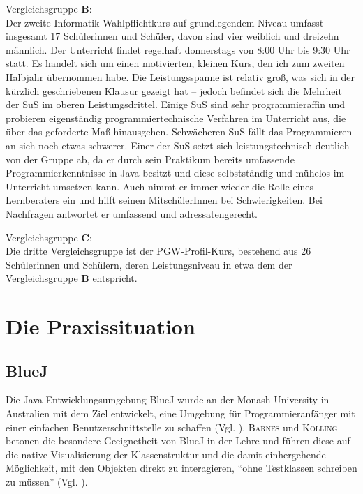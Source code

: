 \documentclass[paper=a4, DIV=13, BCOR=12mm, twoside=on, onecolumn=on, open = any, titlepage =on, parskip =half-, headsepline = on, footsepline = on, chapterprefix = on, sectionprefix = on, appendixprefix = off, fontsize = 11pt, numbers = noenddot, abstract = off]{scrreprt}
\begin{document}
Vergleichsgruppe \textsc{\textbf{B}}:\\
Der zweite Informatik-Wahlpflichtkurs auf grundlegendem Niveau umfasst insgesamt 17 Schülerinnen und Schüler, davon sind vier weiblich und dreizehn männlich. Der Unterricht findet regelhaft donnerstags von 8:00 Uhr bis 9:30 Uhr statt. 
Es handelt sich um einen motivierten, kleinen Kurs, den ich zum zweiten Halbjahr übernommen habe. Die Leistungsspanne ist relativ groß, was sich in der kürzlich geschriebenen Klausur gezeigt hat – jedoch befindet sich die Mehrheit der SuS im oberen Leistungsdrittel. Einige SuS sind sehr programmieraffin und probieren eigenständig programmiertechnische Verfahren im Unterricht aus, die über das geforderte Maß hinausgehen. Schwächeren SuS fällt das Programmieren an sich noch etwas schwerer. Einer der SuS setzt sich leistungstechnisch deutlich von der Gruppe ab, da er durch sein Praktikum bereits umfassende Programmierkenntnisse in Java besitzt und diese selbstständig und mühelos im Unterricht umsetzen kann. Auch nimmt er immer wieder die Rolle eines Lernberaters ein und hilft seinen MitschülerInnen bei Schwierigkeiten. Bei Nachfragen antwortet er umfassend und adressatengerecht.

Vergleichsgruppe \textsc{\textbf{C}}:\\
Die dritte Vergleichsgruppe ist der PGW-Profil-Kurs, bestehend aus 26 Schülerinnen und Schülern, deren Leistungsniveau in etwa dem der Vergleichsgruppe \textsc{\textbf{B}} entspricht. 

\chapter{Die Praxissituation}


\par \singlespacing
 \section{BlueJ}

\label{sec:bluej}
Die Java-Entwicklungsumgebung BlueJ wurde an der Monash University in Australien mit dem Ziel entwickelt, eine Umgebung für Programmieranfänger mit einer einfachen Benutzerschnittstelle zu schaffen (Vgl. \cite[S.14]{barnes:03}). \textsc{Barnes} und \textsc{Kölling} betonen die besondere Geeignetheit von BlueJ in der Lehre und führen diese auf die native Visualisierung der Klassenstruktur und die damit einhergehende Möglichkeit, mit den Objekten direkt zu interagieren, "`ohne Testklassen schreiben zu müssen"' (Vgl. \cite[S.15]{barnes:03}). 
\end{document}
